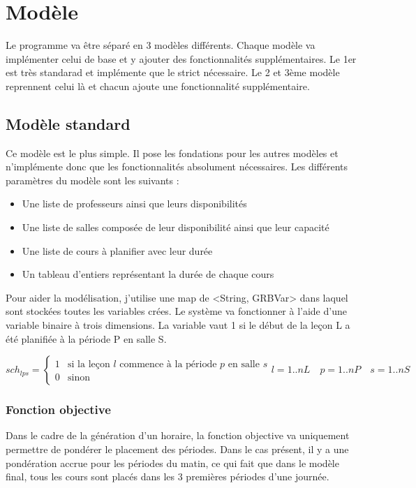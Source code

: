 \section{Modèle}
Le programme va être séparé en 3 modèles différents. Chaque modèle va implémenter celui de base et y ajouter des fonctionnalités supplémentaires. Le 1er est très standarad et implémente que le strict nécessaire. Le 2 et 3ème modèle reprennent celui là et chacun ajoute une fonctionnalité supplémentaire.

\subsection{Modèle standard}
Ce modèle est le plus simple. Il pose les fondations pour les autres modèles et n'implémente donc que les fonctionnalités absolument nécessaires. Les différents paramètres du modèle sont les suivants :

\begin{itemize}
\item Une liste de professeurs ainsi que leurs disponibilités
\item Une liste de salles composée de leur disponibilité ainsi que leur capacité
\item Une liste de cours à planifier avec leur durée
\item Un tableau d'entiers représentant la durée de chaque cours
\end{itemize}

Pour aider la modélisation, j'utilise une map de <String, GRBVar> dans laquel sont stockées toutes les variables crées. Le système va fonctionner à l'aide d'une variable binaire à trois dimensions. La variable vaut 1 si le début de la leçon L a été planifiée à la période P en salle S.

\begin{equation*}
sch_{lps} =
\begin{cases}
1 & \text{si la leçon $l$ commence à la période $p$ en salle $s$} \\
0 & \text{sinon}
\end{cases}
l = 1 .. nL \quad p = 1 .. nP \quad s = 1 .. nS
\end{equation*}

\subsubsection{Fonction objective}
Dans le cadre de la génération d'un horaire, la fonction objective va uniquement permettre de pondérer le placement des périodes. Dans le cas présent, il y a une pondération accrue pour les périodes du matin, ce qui fait que dans le modèle final, tous les cours sont placés dans les 3 premières périodes d'une journée.

